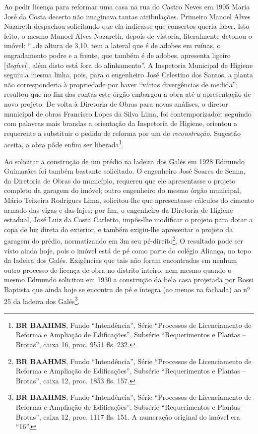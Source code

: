 Ao pedir licença para reformar uma casa na rua do Castro Neves em 1905 Maria José da Costa decerto não imaginava tantas atribulações. Primeiro Manoel Alves Nazareth despachou solicitando que ela indicasse que consertos queria fazer. Isto feito, o mesmo Manoel Alves Nazareth, depois de vistoria, literalmente detonou o imóvel: ``\dots de altura de 3,10, tem a lateral que é de adobes em ruínas, o engradamento podre e a frente, que também é de adobes, apresenta ligeiro [\textit{ilegível}], além disto está fora do alinhamento''. A Inspetoria Municipal de Higiene seguiu a mesma linha, pois, para o engenheiro José Celestino dos Santos, a planta não corresponderia à propriedade por haver ``várias divergências de medida''; resultou que no fim das contas este órgão embargou a obra até a apresentação de novo projeto. De volta à Diretoria de Obras para novas análises, o diretor municipal de obras Francisco Lopes da Silva Lima, foi contemporizador: seguindo com palavras mais brandas a orientação da Inspetoria de Higiene, orientou a requerente a substituir o pedido de reforma por um de \textit{reconstrução}. Sugestão aceita, a obra pôde enfim ser liberada\footnote{\textbf{BR BAAHMS}, Fundo ``Intendência'', Série ``Processos de Licenciamento de Reforma e Ampliação de Edificações'', Subsérie ``Requerimentos e Plantas -- Brotas'', caixa 16, proc. 9551 fls. 232.}.

Ao solicitar a construção de um prédio na ladeira dos Galés em 1928 Edmundo Guimarães foi também bastante solicitado. O engenheiro José Soares de Senna, da Diretoria de Obras do município, requereu que ele apresentasse o projeto completo da garagem do imóvel; outro engenheiro do mesmo órgão municipal, Mário Teixeira Rodrigues Lima, solicitou-lhe que apresentasse cálculos do cimento armado das vigas e das lajes; por fim, o engenheiro da Diretoria de Higiene estadual, José Luiz da Costa Carletto, impôs-lhe modificar o projeto para dotar a copa de luz direta do exterior, e também exigiu-lhe apresentar o projeto da garagem do prédio, normatizando em 3m seu pé-direito\footnote{\textbf{BR BAAHMS}, Fundo ``Intendência'', Série ``Processos de Licenciamento de Reforma e Ampliação de Edificações'', Subsérie ``Requerimentos e Plantas -- Brotas'', caixa 12, proc. 1853 fls. 157.}. O resultado pode ser visto ainda hoje, pois o imóvel está de pé como parte do colégio Aliança, no topo da ladeira dos Galés. Exigências que tais não foram encontradas em nenhum outro processo de licença de obra no distrito inteiro, nem mesmo quando o mesmo Edmundo solicitou em 1930 a construção da bela casa projetada por Rossi Baptista que ainda hoje se encontra de pé e íntegra (ao menos na fachada) ao nº 25 da ladeira dos Galés\footnote{\textbf{BR BAAHMS}, Fundo ``Intendência'', Série ``Processos de Licenciamento de Reforma e Ampliação de Edificações'', Subsérie ``Requerimentos e Plantas -- Brotas'', caixa 12, proc. 1117 fls. 151. A numeração original do imóvel era ``16''.}.

